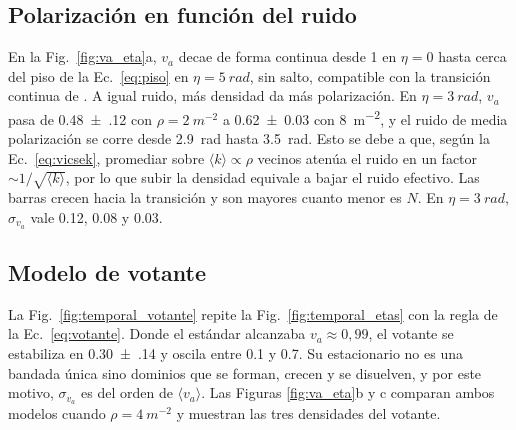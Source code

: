 \documentclass[10pt,a4paper]{article}
\newcommand{\va}{\ensuremath{v_a}}
\begin{document}
\subsection{Polarización en función del ruido}
\label{sec:va}

En la Fig.~\ref{fig:va_eta}a, \va{} decae de forma continua desde 1 en $\eta = 0$ hasta cerca del piso de la Ec.~\eqref{eq:piso} en $\eta = \SI{5}{rad}$, sin salto, compatible con la transición continua de \cite{vicsek1995}.
A igual ruido, más densidad da más polarización. En $\eta = \SI{3}{rad}$, \va{} pasa de \num{0.48(12)} con $\rho = \SI{2}{m^{-2}}$ a \num{0.62(3)} con \SI{8}{m^{-2}}, y el ruido de media polarización se corre desde \SI{2.9}{rad} hasta \SI{3.5}{rad}.
Esto se debe a que, según la Ec.~\eqref{eq:vicsek}, promediar sobre $\langle k \rangle \propto \rho$ vecinos atenúa el ruido en un factor $\sim 1/\sqrt{\langle k \rangle}$, por lo que subir la densidad equivale a bajar el ruido efectivo. Las barras crecen hacia la transición y son mayores cuanto menor es $N$.
En $\eta = \SI{3}{rad}$, $\sigma_{\va}$ vale \num{0.12}, \num{0.08} y \num{0.03}.

\subsection{Modelo de votante}
\label{sec:votante}

La Fig.~\ref{fig:temporal_votante} repite la Fig.~\ref{fig:temporal_etas} con la regla de la Ec.~\eqref{eq:votante}.
Donde el estándar alcanzaba $\va \approx 0{,}99$, el votante se estabiliza en \num{0.30(14)} y oscila entre \num{0.1} y \num{0.7}.
Su estacionario no es una bandada única sino dominios que se forman, crecen y se disuelven, y por este motivo, $\sigma_{\va}$ es del orden de $\langle \va \rangle$.
Las Figuras \ref{fig:va_eta}b y c comparan ambos modelos cuando $\rho = \SI{4}{m^{-2}}$ y muestran las tres densidades del votante.
\end{document}
